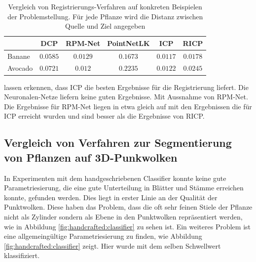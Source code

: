 \documentclass[12pt,titlepage, twoside]{article}
\begin{document}
\begin{table}
    \begin{center}
    \begin{tabular}{|l || c | c | c | c | c | } 
        \hline
         & DCP & RPM-Net & PointNetLK & ICP & RICP \\  
        \hline
        \hline
        Banane & $0.0585$ & $0.0129$& $0.1673$& $0.0117$& $0.0178$\\
        \hline
        Avocado & $0.0721$& $0.012$& $0.2235$& $0.0122$& $0.0245$\\
        \hline
    \end{tabular}
    \end{center}
    \caption{Vergleich von Registrierungs-Verfahren auf konkreten Beispielen der Problemstellung. Für jede Pflanze wird die Distanz zwischen Quelle und Ziel angegeben}
    \label{tab:registration:real:compare}
\end{table}

lassen erkennen, dass ICP die besten Ergebnisse für die Registrierung liefert. 
Die Neuronalen-Netze liefern keine guten Ergebnisse. Mit Aussnahme von RPM-Net. 
Die Ergebnisse für RPM-Net liegen in etwa gleich auf mit den Ergebnissen die für ICP erreicht wurden und sind besser als die Ergebnisse von RICP.

\subsection{Vergleich von Verfahren zur Segmentierung von Pflanzen auf 3D-Punkwolken}

In Experimenten mit dem handgeschriebenen Classifier konnte keine gute Parametriesierung, die eine gute Unterteilung in Blätter und Stämme erreichen konnte, gefunden werden. 
Dies liegt in erster Linie an der Qualität der Punktwolken.
Diese haben das Problem, dass die oft sehr feinen Stiele der Pflanze nicht als Zylinder sondern als Ebene in den Punktwolken repräsentiert werden, wie in Abbildung \ref{fig:handcrafted:classifier} zu sehen ist.
Ein weiteres Problem ist eine allgemeingültige Parametriesierung zu finden, wie Abbildung \ref{fig:handcrafted:classifier} zeigt. Hier wurde mit dem selben Schwellwert klassifiziert.
\end{document}
